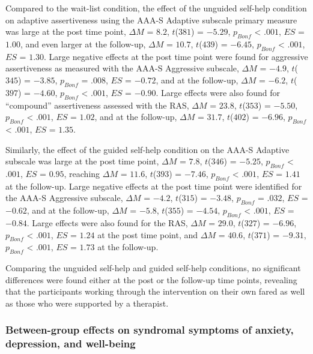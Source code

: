 \documentclass[preprint,
3p]{elsarticle} %
\begin{document}
Compared to the wait-list condition, the effect of the unguided
self-help condition on adaptive assertiveness using the AAA-S Adaptive
subscale primary measure was large at the post time point, \(\Delta M\)
= \(8.2\), \(t\)(\(381\)) = \(-5.29\), \(p_{ Bonf }\) \textless{}
\(.001\), \(ES\) = \(1.00\), and even larger at the follow-up,
\(\Delta M\) = \(10.7\), \(t\)(\(439\)) = \(-6.45\), \(p_{ Bonf }\)
\textless{} \(.001\), \(ES\) = \(1.30\). Large negative effects at the
post time point were found for aggressive assertiveness as measured with
the AAA-S Aggressive subscale, \(\Delta M\) = \(-4.9\), \(t\)(\(345\)) =
\(-3.85\), \(p_{ Bonf }\) = \(.008\), \(ES\) = \(-0.72\), and at the
follow-up, \(\Delta M\) = \(-6.2\), \(t\)(\(397\)) = \(-4.60\),
\(p_{ Bonf }\) \textless{} \(.001\), \(ES\) = \(-0.90\). Large effects
were also found for ``compound'' assertiveness assessed with the RAS,
\(\Delta M\) = \(23.8\), \(t\)(\(353\)) = \(-5.50\), \(p_{ Bonf }\)
\textless{} \(.001\), \(ES\) = \(1.02\), and at the follow-up,
\(\Delta M\) = \(31.7\), \(t\)(\(402\)) = \(-6.96\), \(p_{ Bonf }\)
\textless{} \(.001\), \(ES\) = \(1.35\).

Similarly, the effect of the guided self-help condition on the AAA-S
Adaptive subscale was large at the post time point, \(\Delta M\) =
\(7.8\), \(t\)(\(346\)) = \(-5.25\), \(p_{ Bonf }\) \textless{}
\(.001\), \(ES\) = \(0.95\), reaching \(\Delta M\) = \(11.6\),
\(t\)(\(393\)) = \(-7.46\), \(p_{ Bonf }\) \textless{} \(.001\), \(ES\)
= \(1.41\) at the follow-up. Large negative effects at the post time
point were identified for the AAA-S Aggressive subscale, \(\Delta M\) =
\(-4.2\), \(t\)(\(315\)) = \(-3.48\), \(p_{ Bonf }\) = \(.032\), \(ES\)
= \(-0.62\), and at the follow-up, \(\Delta M\) = \(-5.8\),
\(t\)(\(355\)) = \(-4.54\), \(p_{ Bonf }\) \textless{} \(.001\), \(ES\)
= \(-0.84\). Large effects were also found for the RAS, \(\Delta M\) =
\(29.0\), \(t\)(\(327\)) = \(-6.96\), \(p_{ Bonf }\) \textless{}
\(.001\), \(ES\) = \(1.24\) at the post time point, and \(\Delta M\) =
\(40.6\), \(t\)(\(371\)) = \(-9.31\), \(p_{ Bonf }\) \textless{}
\(.001\), \(ES\) = \(1.73\) at the follow-up.

Comparing the unguided self-help and guided self-help conditions, no
significant differences were found either at the post or the follow-up
time points, revealing that the participants working through the
intervention on their own fared as well as those who were supported by a
therapist.

\hypertarget{between-group-effects-on-syndromal-symptoms-of-anxiety-depression-and-well-being}{%
\subsubsection{Between-group effects on syndromal symptoms of anxiety,
depression, and
well-being}\label{between-group-effects-on-syndromal-symptoms-of-anxiety-depression-and-well-being}}
\end{document}
